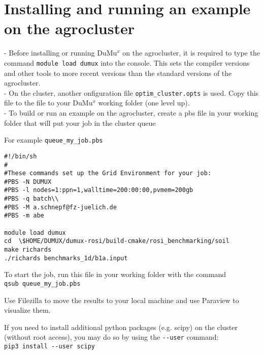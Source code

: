 \section*{Installing and running an example on the agrocluster}
- Before installing or running DuMu$^x$ on the agrocluster, it is required to type the command \lstinline{module load dumux} into the console. This sets the compiler versions and other tools to more recent versions than the standard versions of the agrocluster.\\
- On the cluster, another onfiguration file \lstinline{optim_cluster.opts} is used. Copy this file to the file to your DuMu$^x$ working folder (one level up).\\ 
- To build or run an example on the agrocluster, create a pbs file in your working folder that will put your job in the cluster queue

For example \lstinline{queue_my_job.pbs}

\begin{lstlisting}
#!/bin/sh
#
#These commands set up the Grid Environment for your job:
#PBS -N DUMUX 
#PBS -l nodes=1:ppn=1,walltime=200:00:00,pvmem=200gb
#PBS -q batch\\
#PBS -M a.schnepf@fz-juelich.de
#PBS -m abe

module load dumux 
cd  \$HOME/DUMUX/dumux-rosi/build-cmake/rosi_benchmarking/soil
make richards      
./richards benchmarks_1d/b1a.input     
\end{lstlisting}


To start the job, run this file in your working folder with the command \\
\lstinline{qsub queue_my_job.pbs}

Use Filezilla to move the results to your local machine and use Paraview to visualize them. 

If you need to install additional python packages (e.g. scipy) on the cluster (without root access), you may do so by using the \lstinline{--user} command: \\
\lstinline{pip3 install --user scipy}
